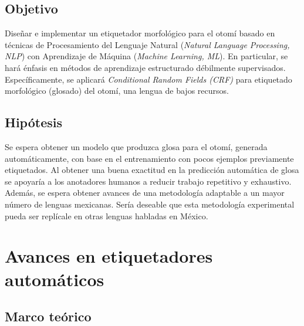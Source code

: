 \documentclass[letterpaper,12pt,oneside]{book}
\theoremstyle{definition}
\begin{document}
	
	\section{Objetivo}

	
	Diseñar e implementar un etiquetador morfológico para el otomí basado en técnicas de Procesamiento del Lenguaje Natural (\textit{Natural Language Processing, NLP}) con Aprendizaje de Máquina (\textit{Machine Learning, ML}). En particular, se hará énfasis en métodos de aprendizaje estructurado débilmente supervisados. Específicamente, se aplicará \textit{Conditional Random Fields (CRF)} para etiquetado morfológico (glosado) del otomí, una lengua de bajos recursos.

	
	\section{Hipótesis}

	
	Se espera obtener un modelo que produzca glosa para el otomí, generada automáticamente, con base en el entrenamiento con pocos ejemplos previamente etiquetados. Al obtener una buena exactitud en la predicción automática de glosa se apoyaría a los anotadores humanos a reducir trabajo repetitivo y exhaustivo. Además, se espera obtener avances de una metodología adaptable a un mayor número de lenguas mexicanas. Sería deseable que esta metodología experimental pueda ser replícale en otras lenguas habladas en México.

	
	\chapter{Avances en etiquetadores automáticos}

	

	
	\section{Marco teórico}\label{sec:marco}

	

	





\end{document}
